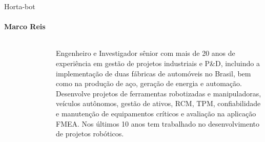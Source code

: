 \begin{frame}[t]{Horta-bot}
    \transboxout[duration=0.5]
    \framesubtitle{Marco Reis}
    \begin{columns}
            
            \begin{figure}
                \vspace*{-0.75cm}
                \hspace*{-1.5cm}
            \end{figure}
            
                \vspace*{0.1cm}
                \justifying
                
                Engenheiro e Investigador sênior com mais de 20 anos de experiência em gestão de projetos industriais e P\&D,
                incluindo a implementação de duas fábricas de automóveis no Brasil, bem como na produção de aço, geração de
                energia e automação. Desenvolve projetos de ferramentas robotizadas e manipuladoras, veículos autônomos, gestão
                de ativos, RCM, TPM, confiabilidade e manutenção de equipamentos críticos e avaliação na aplicação FMEA. 
                Nos últimos 10 anos tem trabalhado no desenvolvimento de projetos robóticos.
    \end{columns}
\end{frame}

